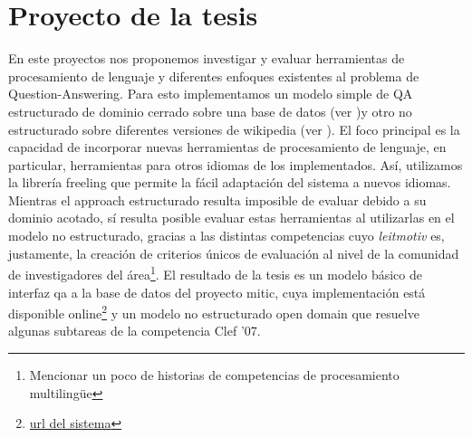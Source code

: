 \section{Proyecto de la tesis}
\horrible
En este proyectos nos proponemos investigar y evaluar herramientas de procesamiento de lenguaje y diferentes enfoques existentes al problema
de Question-Answering. Para esto implementamos un modelo simple de QA estructurado de dominio cerrado sobre una base de datos (ver )y otro 
no estructurado sobre diferentes versiones de wikipedia (ver ). El foco principal es la capacidad de incorporar nuevas herramientas de procesamiento de lenguaje, en particular,
herramientas para otros idiomas de los implementados. Así, utilizamos la librería freeling que permite la fácil adaptación del sistema a nuevos idiomas.
Mientras el approach estructurado resulta imposible de evaluar debido a su dominio acotado, sí resulta posible evaluar estas herramientas al utilizarlas en el modelo no estructurado, gracias a las distintas competencias cuyo \textit{leitmotiv} es, justamente, la creación de criterios únicos de evaluación al nivel de la comunidad de investigadores del área\footnote{{\color{red} Mencionar un poco de historias de competencias de procesamiento multilingüe}}. El resultado de la tesis es un modelo básico de interfaz qa a la base de datos del proyecto mitic, cuya implementación está disponible online\footnote{{\color{red}\url{url del sistema}}} y un modelo no estructurado open domain que resuelve algunas subtareas de la competencia Clef '07.


